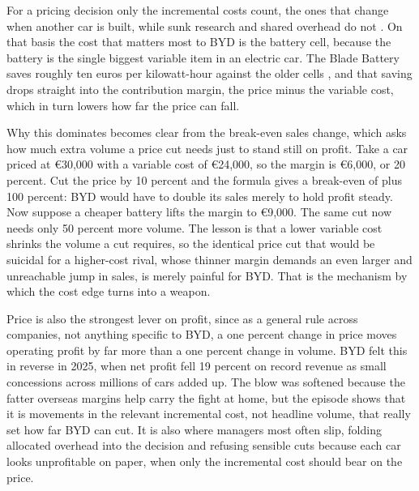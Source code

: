 
For a pricing decision only the incremental costs count, the ones that change when another car is built, while sunk research and shared overhead do not \cite{nagle2018}. On that basis the cost that matters most to BYD is the battery cell, because the battery is the single biggest variable item in an electric car. The Blade Battery saves roughly ten euros per kilowatt-hour against the older cells \cite{motleyfool2025}, and that saving drops straight into the contribution margin, the price minus the variable cost, which in turn lowers how far the price can fall.

Why this dominates becomes clear from the break-even sales change, which asks how much extra volume a price cut needs just to stand still on profit. Take a car priced at \euro30{,}000 with a variable cost of \euro24{,}000, so the margin is \euro6{,}000, or 20 percent. Cut the price by 10 percent and the formula gives a break-even of plus 100 percent: BYD would have to double its sales merely to hold profit steady. Now suppose a cheaper battery lifts the margin to \euro9{,}000. The same cut now needs only 50 percent more volume. The lesson is that a lower variable cost shrinks the volume a cut requires, so the identical price cut that would be suicidal for a higher-cost rival, whose thinner margin demands an even larger and unreachable jump in sales, is merely painful for BYD. That is the mechanism by which the cost edge turns into a weapon.

Price is also the strongest lever on profit, since as a general rule across companies, not anything specific to BYD, a one percent change in price moves operating profit by far more than a one percent change in volume. BYD felt this in reverse in 2025, when net profit fell 19 percent on record revenue \cite{byd2025} as small concessions across millions of cars added up. The blow was softened because the fatter overseas margins help carry the fight at home, but the episode shows that it is movements in the relevant incremental cost, not headline volume, that really set how far BYD can cut. It is also where managers most often slip, folding allocated overhead into the decision and refusing sensible cuts because each car looks unprofitable on paper, when only the incremental cost should bear on the price.
